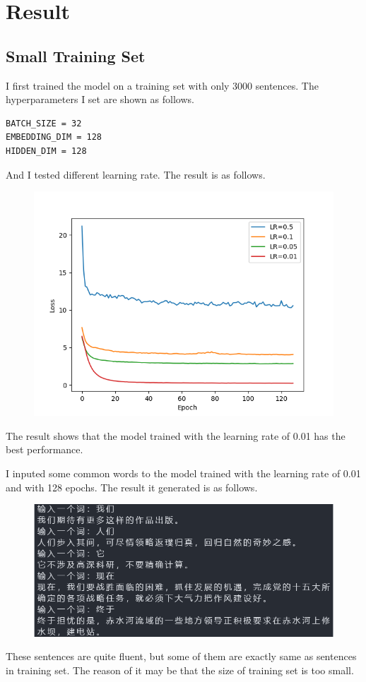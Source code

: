 \documentclass[UTF8, a4paper, 11pt]{article}
\begin{document}
\section{Result}
\subsection{Small Training Set}
I first trained the model on a training set with only 3000 sentences. The hyperparameters I set are shown as follows.
\begin{lstlisting}
BATCH_SIZE = 32
EMBEDDING_DIM = 128
HIDDEN_DIM = 128
\end{lstlisting}

And I tested different learning rate. The result is as follows.
\begin{figure}[H]
      \centering
      \includegraphics[width = 0.8 \textwidth]{loss3000.png}
\end{figure}
The result shows that the model trained with the learning rate of 0.01 has the best performance.

I inputed some common words to the model trained with the learning rate of 0.01 and with 128 epochs. The result it generated is as follows.
\begin{figure}[H]
      \centering
      \includegraphics[width = 0.8 \textwidth]{test3000.png}
\end{figure}
These sentences are quite fluent, but some of them are exactly same as sentences in training set. The reason of it may be that the size of training set is too small.
\end{document}
